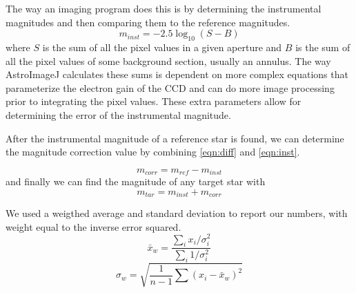 \documentclass[%
aip,
jmp,
reprint,
floatfix
]{revtex4-1}
\begin{document}
	The way an imaging program does this is by determining the instrumental magnitudes and then comparing them to the reference magnitudes. 
	\begin{equation}
	 	m_{inst} = -2.5 \log_{10}(S-B)
	 	\label{eqn:inst}
	\end{equation}
	where $S$ is the sum of all the pixel values in a given aperture and $B$ is the sum of all the pixel values of some background section, usually an annulus. The way AstroImageJ calculates these sums is dependent on more complex equations that parameterize the electron gain of the CCD and can do more image processing prior to integrating the pixel values. These extra parameters allow for determining the error of the instrumental magnitude.
	
	After the instrumental magnitude of a reference star is found, we can determine the magnitude correction value by combining \autoref{eqn:diff} and \autoref{eqn:inst}.
	
	\begin{equation}
		m_{corr} = m_{ref} - m_{inst}
		\label{eqn:corrected}
	\end{equation}
	and finally we can find the magnitude of any target star with 
	\begin{equation}
		m_{tar} = m_{inst} + m_{corr}
		\label{eqn:final}
	\end{equation}
	
	We used a weigthed average and standard deviation to report our numbers, with weight equal to the inverse error squared.
	\begin{equation}
	 	\bar{x}_w = \frac{\sum_i{x_i/\sigma_i^2}}{\sum_i{1/\sigma_i^2}}
	 	\label{eqn:wa}
	\end{equation}
	\begin{equation}
	\sigma_w = \sqrt{\frac{1}{n-1} \sum{(x_i -\bar{x}_w)^2}}
	\label{eqn:ws}
	\end{equation}
	


\end{document}
